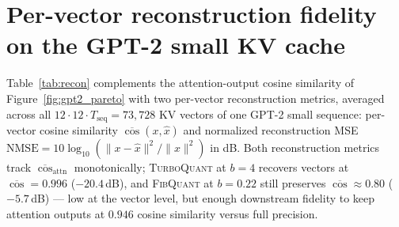 \documentclass{article}
\theoremstyle{definition}
\theoremstyle{remark}
\begin{document}
\section{Per-vector reconstruction fidelity on the GPT-2 small KV cache}
\label{app:recon}

Table~\ref{tab:recon} complements the attention-output cosine
similarity of Figure~\ref{fig:gpt2_pareto} with two per-vector
reconstruction metrics, averaged across all
$12 \cdot 12 \cdot T_{\mathrm{seq}} = 73{,}728$ KV vectors of one
GPT-2 small sequence: per-vector cosine similarity
$\overline{\cos}(x, \hat x)$ and normalized reconstruction MSE
$\mathrm{NMSE} = 10\log_{10}(\|x - \hat x\|^2 / \|x\|^2)$ in dB.
Both reconstruction metrics track $\overline{\cos}_{\mathrm{attn}}$
monotonically; \textsc{TurboQuant} at $b = 4$ recovers vectors at
$\overline{\cos} = 0.996$ ($-20.4$\,dB), and \textsc{FibQuant} at
$b = 0.22$ still preserves $\overline{\cos} \approx 0.80$
($-5.7$\,dB) --- low at the vector level, but enough downstream
fidelity to keep attention outputs at $0.946$ cosine similarity
versus full precision.
\end{document}
